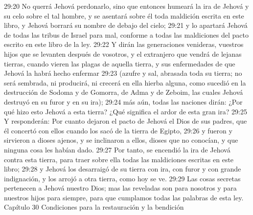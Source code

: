 29:20 No querrá Jehová perdonarlo, sino que entonces humeará la ira de Jehová y su celo sobre el tal hombre, y se asentará sobre él toda maldición escrita en este libro, y Jehová borrará su nombre de debajo del cielo;  
29:21 y lo apartará Jehová de todas las tribus de Israel para mal, conforme a todas las maldiciones del pacto escrito en este libro de la ley.  
29:22 Y dirán las generaciones venideras, vuestros hijos que se levanten después de vosotros, y el extranjero que vendrá de lejanas tierras, cuando vieren las plagas de aquella tierra, y sus enfermedades de que Jehová la habrá hecho enfermar  
29:23 (azufre y sal, abrasada toda su tierra; no será sembrada, ni producirá, ni crecerá en ella hierba alguna, como sucedió en la destrucción de Sodoma y de Gomorra, de Adma y de Zeboim, las cuales Jehová destruyó en su furor y en su ira);  
29:24 más aún, todas las naciones dirán: ¿Por qué hizo esto Jehová a esta tierra? ¿Qué significa el ardor de esta gran ira?  
29:25 Y responderán: Por cuanto dejaron el pacto de Jehová el Dios de sus padres, que él concertó con ellos cuando los sacó de la tierra de Egipto,  
29:26 y fueron y sirvieron a dioses ajenos, y se inclinaron a ellos, dioses que no conocían, y que ninguna cosa les habían dado.  
29:27 Por tanto, se encendió la ira de Jehová contra esta tierra, para traer sobre ella todas las maldiciones escritas en este libro;  
29:28 y Jehová los desarraigó de su tierra con ira, con furor y con grande indignación, y los arrojó a otra tierra, como hoy se ve.  
29:29 Las cosas secretas pertenecen a Jehová nuestro Dios; mas las reveladas son para nosotros y para nuestros hijos para siempre, para que cumplamos todas las palabras de esta ley.  
Capítulo 30
Condiciones para la restauración y la bendición  

